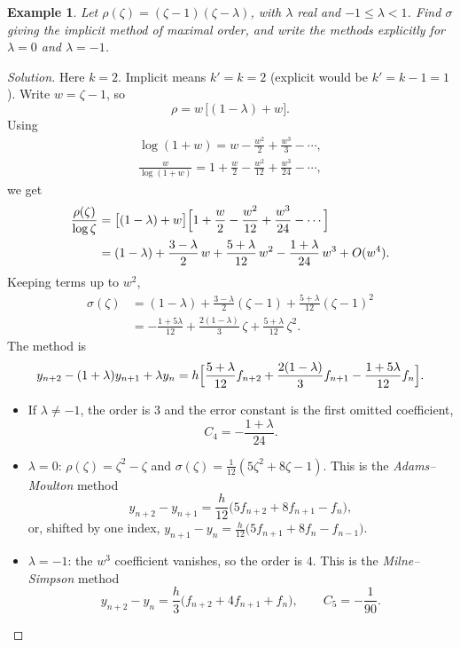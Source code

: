 \documentclass[11pt,a4paper]{article}
\numberwithin{equation}{section}
\theoremstyle{spacedplain}
\theoremstyle{spaceddefinition}
\newtheorem{example}[theorem]{Example}
\theoremstyle{spacedremark}
\begin{document}
\begin{example}\label{ex:henrici}
Let \(\rho(\zeta)=(\zeta-1)(\zeta-\lambda)\), with \(\lambda\) real and
\(-1\le\lambda<1\).  Find \(\sigma\) giving the implicit method of
maximal order, and write the methods explicitly for \(\lambda=0\) and
\(\lambda=-1\).
\end{example}

\begin{proof}[Solution]
Here \(k=2\).  Implicit means \(k'=k=2\) (explicit would be
\(k'=k-1=1\)).  Write \(w=\zeta-1\), so
\[
  \rho=w\,\bigl[(1-\lambda)+w\bigr].
\]
Using
\[
\begin{gathered}
  \log(1+w)=w-\frac{w^2}{2}+\frac{w^3}{3}-\cdots,
  \\
  \frac{w}{\log(1+w)}=1+\frac w2-\frac{w^2}{12}+\frac{w^3}{24}-\cdots,
\end{gathered}
\]
we get
\begin{align*}
  \frac{\rho(\zeta)}{\log\zeta}
  &=\bigl[(1-\lambda)+w\bigr]
    \Bigl[1+\frac w2-\frac{w^2}{12}+\frac{w^3}{24}-\cdots\Bigr]\\
  &=(1-\lambda)+\frac{3-\lambda}{2}\,w+\frac{5+\lambda}{12}\,w^2
    -\frac{1+\lambda}{24}\,w^3+O(w^4).
\end{align*}
Keeping terms up to \(w^2\),
\begin{align*}
  \sigma(\zeta)
  &=(1-\lambda)+\frac{3-\lambda}2(\zeta-1)
    +\frac{5+\lambda}{12}(\zeta-1)^2\\
  &=-\frac{1+5\lambda}{12}+\frac{2(1-\lambda)}{3}\,\zeta
    +\frac{5+\lambda}{12}\,\zeta^2 .
\end{align*}
The method is
\[
  y_{n+2}-(1+\lambda)y_{n+1}+\lambda y_n
  =h\Bigl[\frac{5+\lambda}{12}f_{n+2}
         +\frac{2(1-\lambda)}3f_{n+1}
         -\frac{1+5\lambda}{12}f_n\Bigr].
\]
\begin{itemize}
  \item If \(\lambda\ne-1\), the order is \(3\) and the error constant
    is the first omitted coefficient,
    \[
      C_4=-\frac{1+\lambda}{24}.
    \]
  \item \(\lambda=0\): \(\rho(\zeta)=\zeta^2-\zeta\) and
    \(\sigma(\zeta)=\frac1{12}(5\zeta^2+8\zeta-1)\).  This is the
    \emph{Adams--Moulton} method
    \[
      y_{n+2}-y_{n+1}=\frac h{12}\bigl(5f_{n+2}+8f_{n+1}-f_n\bigr),
    \]
    or, shifted by one index,
    \(y_{n+1}-y_n=\frac h{12}\bigl(5f_{n+1}+8f_n-f_{n-1}\bigr)\).
  \item \(\lambda=-1\): the \(w^3\) coefficient vanishes, so the order
    is \(4\).  This is the \emph{Milne--Simpson} method
    \[
      y_{n+2}-y_n=\frac h3\bigl(f_{n+2}+4f_{n+1}+f_n\bigr),
      \qquad C_5=-\frac1{90}.
    \]
\end{itemize}
\end{proof}
\end{document}
